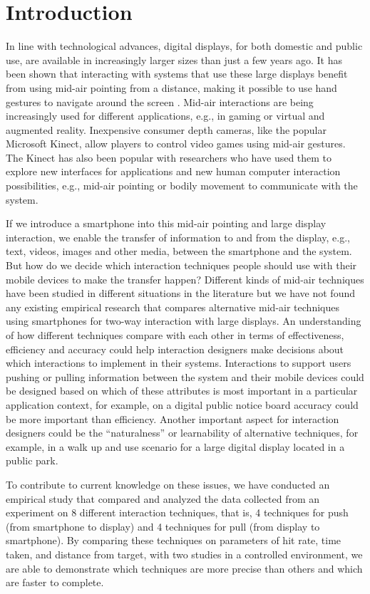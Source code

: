 \section{Introduction} \label{sec:introduction}
In line with technological advances, digital displays, for both domestic and public use, are available in increasingly larger sizes than just a few years ago.
It has been shown that interacting with systems that use these large displays benefit from using mid-air pointing from a distance, making it possible to use hand gestures to navigate around the screen \cite{Jakobsen:2015}.
Mid-air interactions are being increasingly used for different applications, e.g., in gaming or virtual and augmented reality.
Inexpensive consumer depth cameras, like the popular Microsoft Kinect, allow players to control video games using mid-air gestures.
The Kinect has also been popular with researchers who have used them to explore new interfaces for applications and new human computer interaction possibilities, e.g., mid-air pointing or bodily movement to communicate with the system.

If we introduce a smartphone into this mid-air pointing and large display interaction, we enable the transfer of information to and from the display, e.g., text, videos, images and other media, between the smartphone and the system.
But how do we decide which interaction techniques people should use with their mobile devices to make the transfer happen? Different kinds of mid-air techniques have been studied in different situations in the literature but we have not found any existing empirical research that compares alternative mid-air techniques using smartphones for two-way interaction with large displays.
An understanding of how different techniques compare with each other in terms of effectiveness, efficiency and accuracy could help interaction designers make decisions about which interactions to implement in their systems.
Interactions to support users pushing or pulling information between the system and their mobile devices could be designed based on which of these attributes is most important in a particular application context, for example, on a digital public notice board accuracy could be more important than efficiency.
Another important aspect for interaction designers could be the “naturalness” or learnability of alternative techniques, for example, in a walk up and use scenario for a large digital display located in a public park.

To contribute to current knowledge on these issues, we have conducted an empirical study that compared and analyzed the data collected from an experiment on 8 different interaction techniques, that is, 4 techniques for push (from smartphone to display) and 4 techniques for pull (from display to smartphone).
By comparing these techniques on parameters of hit rate, time taken, and distance from target, with two studies in a controlled environment, we are able to demonstrate which techniques are more precise than others and which are faster to complete.

